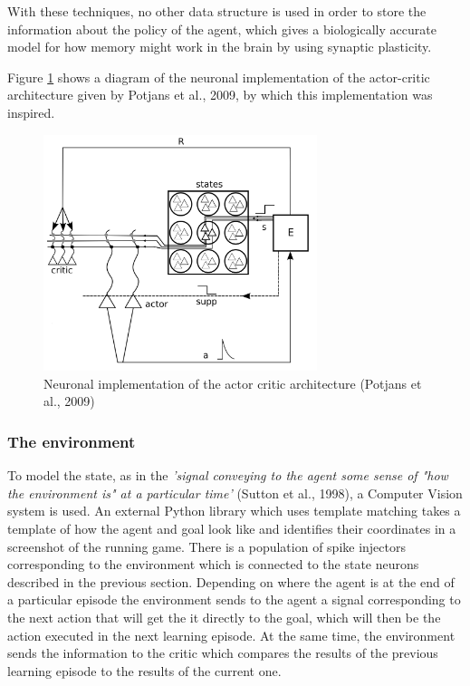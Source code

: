 \documentclass[10pt]{article}
\begin{document}
    With these techniques, no other data structure is used in order to store the information about the policy of the agent, which gives a biologically accurate model for how memory might work in the brain by using synaptic plasticity.

    Figure \ref{fig:potjansImplementation} shows a diagram of the neuronal implementation of the actor-critic architecture given by Potjans et al., 2009, by which this implementation was inspired.

    \begin{figure}[ht!]
    \centering
    \includegraphics[width=80mm]{./implementation.png}
    \caption{Neuronal implementation of the actor critic architecture (Potjans et al., 2009)}
    \label{fig:potjansImplementation}
    \end{figure}

    \subsubsection{The environment}

    To model the state, as in the \textit{'signal conveying to the agent some sense of "how the environment is" at a particular time'} (Sutton et al., 1998), a Computer Vision system is used. An external Python library which uses template matching takes a template of how the agent and goal look like and identifies their coordinates in a screenshot of the running game. There is a population of spike injectors corresponding to the environment which is connected to the state neurons described in the previous section. Depending on where the agent is at the end of a particular episode the environment sends to the agent a signal corresponding to the next action that will get the it directly to the goal, which will then be the action executed in the next learning episode. At the same time, the environment sends the information to the critic which compares the results of the previous learning episode to the results of the current one.
\end{document}
